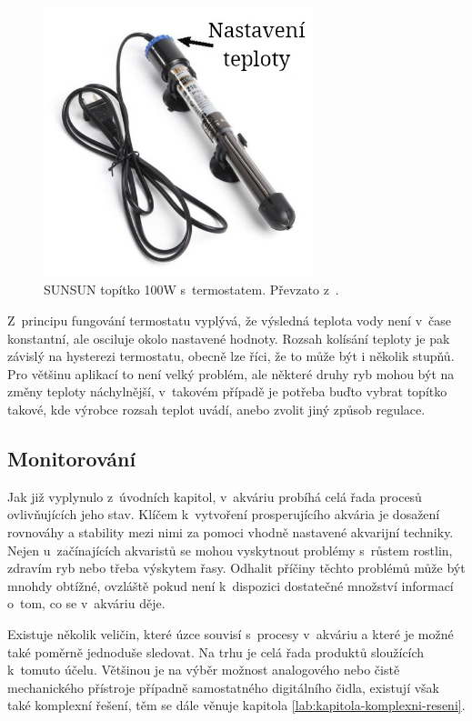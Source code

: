         \begin{figure}[h!]
            \centering
            \includegraphics[width=0.7\textwidth]{obrazky/topeni/topitko.jpg}
            \caption{SUNSUN topítko 100W s~termostatem. Převzato z~\cite{eshop-rostlinna-akvaria}.}
            \label{fig:obrazky-topeni-topitko-jpg}
        \end{figure}
        
        Z~principu fungování termostatu vyplývá, že výsledná teplota vody není v~čase konstantní, ale osciluje okolo nastavené hodnoty. Rozsah kolísání teploty je pak závislý na hysterezi termostatu, obecně lze říci, že to může být i několik stupňů. Pro většinu aplikací to není velký problém, ale některé druhy ryb mohou být na změny teploty náchylnější, v~takovém případě je potřeba buďto vybrat topítko takové, kde výrobce rozsah teplot uvádí, anebo zvolit jiný způsob regulace. 

    \subsection{Monitorování}
        Jak již vyplynulo z~úvodních kapitol, v~akváriu probíhá celá řada procesů ovlivňujících jeho stav. Klíčem k~vytvoření prosperujícího akvária je dosažení rovnováhy a stability mezi nimi za pomoci vhodně nastavené akvarijní techniky. Nejen u~začínajících akvaristů se mohou vyskytnout problémy s~růstem rostlin, zdravím ryb nebo třeba výskytem řasy. Odhalit příčiny těchto problémů může být mnohdy obtížné, ovzláště pokud není k~dispozici dostatečné množství informací o~tom, co se v~akváriu děje. 
        
        Existuje několik veličin, které úzce souvisí s~procesy v~akváriu a které je možné také poměrně jednoduše sledovat. Na trhu je celá řada produktů sloužících k~tomuto účelu. Většinou je na výběr možnost analogového nebo čistě mechanického přístroje případně samostatného digitálního čidla, existují však také komplexní řešení, těm se dále věnuje kapitola  \ref{lab:kapitola-komplexni-reseni}. 

